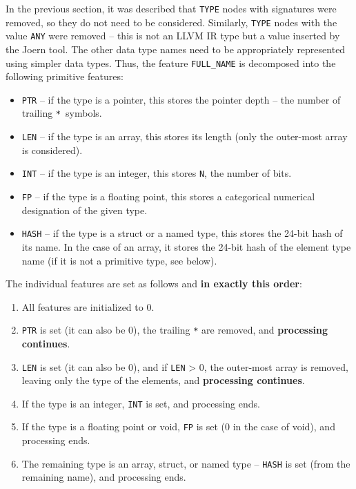 In the previous section, it was described that \texttt{TYPE} nodes with signatures were removed, so they do not need to be considered. Similarly, \texttt{TYPE} nodes with the value \texttt{ANY} were removed -- this is not an LLVM IR type but a value inserted by the Joern tool. The other data type names need to be appropriately represented using simpler data types. Thus, the feature \texttt{FULL\_NAME} is decomposed into the following primitive features:
\begin{itemize}
    \item \texttt{PTR} -- if the type is a pointer, this stores the pointer depth -- the number of trailing \texttt{*}~symbols.
    \item \texttt{LEN} -- if the type is an array, this stores its length (only the outer-most array is considered).
    \item \texttt{INT} -- if the type is an integer, this stores \texttt{N}, the number of bits.
    \item \texttt{FP} -- if the type is a floating point, this stores a categorical numerical designation of the given type.
    \item \texttt{HASH} -- if the type is a struct or a named type, this stores the 24-bit hash of its name. In the case of an array, it stores the 24-bit hash of the element type name (if it is not a primitive type, see below).
\end{itemize}

The individual features are set as follows and \textbf{in exactly this order}:
\begin{enumerate}
    \item All features are initialized to 0.
    \item \texttt{PTR} is set (it can also be 0), the trailing \texttt{*} are removed, and \textbf{processing continues}.
    \item \texttt{LEN} is set (it can also be 0), and if \texttt{LEN} > 0, the outer-most array is removed, leaving only the type of the elements, and \textbf{processing continues}.
    \item If the type is an integer, \texttt{INT} is set, and processing ends.
    \item If the type is a floating point or void, \texttt{FP} is set (0 in the case of void), and processing ends.
    \item The remaining type is an array, struct, or named type -- \texttt{HASH} is set (from the remaining name), and processing ends.
\end{enumerate}

